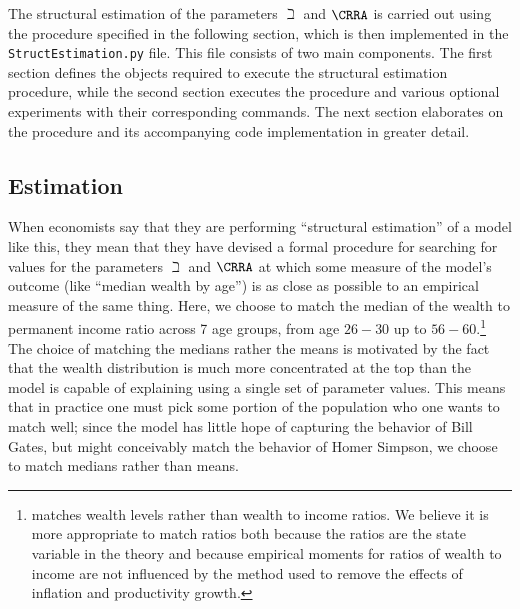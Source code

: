\documentclass[SolvingMicroDSOPs]{subfiles}
\begin{document}
The structural estimation of the parameters $\beth$ and $\CRRA$ is carried out using
the procedure specified in the following section, which is then implemented in
the \texttt{StructEstimation.py} file. This file consists of two main components. The
first section defines the objects required to execute the structural estimation procedure,
while the second section executes the procedure and various optional
experiments with their corresponding commands. The next section elaborates on the procedure
and its accompanying code implementation in greater detail.

\hypertarget{estimation}{}
\subsection{Estimation}

When economists say that they are performing ``structural estimation''
of a model like this, they mean that they have devised a
formal procedure for searching for values for the parameters $\beth$
and $\CRRA$ at which some measure of the model's outcome (like
``median wealth by age'') is as close as possible to an empirical measure
of the same thing. Here, we choose to match the median of the
wealth to permanent income ratio across 7 age groups, from age $26-30$
up to $56-60$.\footnote{\cite{cagettiWprofiles}
  matches wealth levels rather than wealth to income ratios. We
  believe it is more appropriate to match ratios both because the
  ratios are the state variable in the theory and because empirical
  moments for ratios of wealth to income are not influenced by the
  method used to remove the effects of inflation and productivity
  growth.} The choice of matching the medians rather the means is
motivated by the fact that the wealth distribution is much more
concentrated at the top than the model is capable of explaining using a single
set of parameter values.  This means that in practice one must pick
some portion of the population who one wants to match well; since the
model has little hope of capturing the behavior of Bill Gates, but
might conceivably match the behavior of Homer Simpson, we choose to
match medians rather than means.
\end{document}
